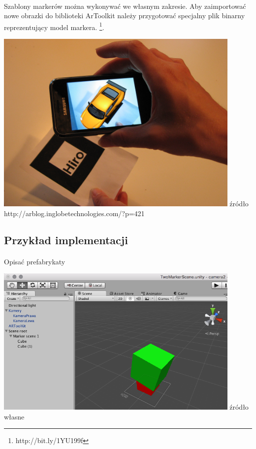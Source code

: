 \documentclass[12pt]{article}
\begin{document}
{{\begin{center}
\end{center}
\paragraph{}
Szablony markerów można wykonywać we własnym zakresie. Aby zaimportować nowe obrazki do biblioteki ArToolkit należy przygotować specjalny plik binarny reprezentujący model markera.
\footnote{http://bit.ly/1YU199f}.

\begin{center}
\includegraphics[width=0.9\textwidth]{images/artoolkit-demo.jpg}
\small {źródło http://arblog.inglobetechnologies.com/?p=421}
\end{center}
\subsection{Przykład implementacji}
\paragraph{}
{\color{red}Opisać prefabrykaty}
\begin{center}
\includegraphics[width=0.9\textwidth]{images/artoolkit-przyklad.png}
\small {źródło własne}
\end{center}
}}
\end{document}
